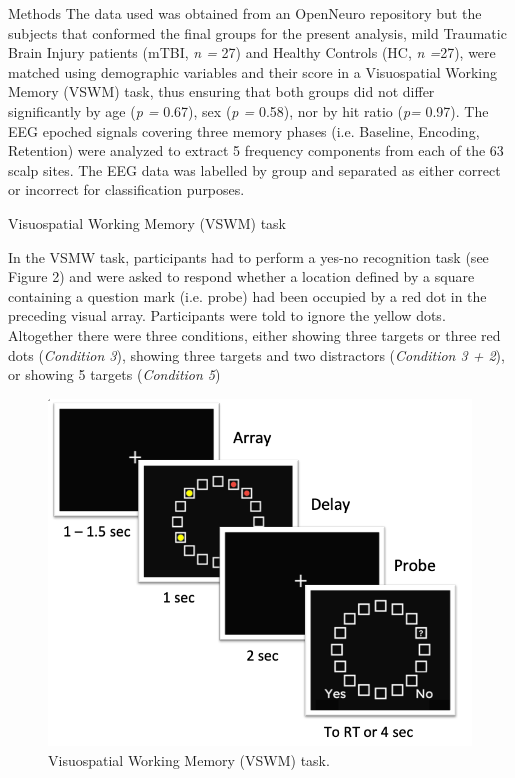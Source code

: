 \documentclass[final]{beamer}
\newlength{\colwidth}
\begin{document}
\begin{frame}[t]
\begin{columns}[t]
\begin{column}{\colwidth}
\begin{block}{Methods}
  The data used was obtained from an OpenNeuro repository but the subjects that conformed the final groups for the present analysis, mild Traumatic Brain Injury patients (mTBI, \textit{n = }27) and Healthy Controls (HC, \textit{n =}27), were matched using demographic variables and their score in a Visuospatial Working Memory (VSWM) task, thus ensuring that both groups did not differ significantly by age (\textit{p =} 0.67), sex (\textit{p =} 0.58), nor by hit ratio (\textit{p= }0.97). The EEG epoched signals covering three memory phases (i.e. Baseline, Encoding, Retention) were analyzed to extract 5 frequency components from each of the 63 scalp sites. The EEG data was labelled by group and separated as either correct or incorrect for classification purposes.
    
  \end{block}

  \begin{block}{Visuospatial Working Memory (VSWM) task}

In the VSMW task, participants had to perform a yes-no recognition task (see Figure 2) and were asked to respond whether a location defined by a square containing a question mark (i.e. probe) had been occupied by a red dot in the preceding visual array. Participants were told to ignore the yellow dots. Altogether there were three conditions, either showing three targets or three red dots (\textit{Condition 3}), showing three targets and two distractors (\textit{Condition 3 + 2}), or showing 5 targets (\textit{Condition 5})

    \begin{figure}
      \centering
     \includegraphics[width=24cm]{img/VSWM_task.png} 
      \caption{Visuospatial Working Memory (VSWM) task.}
    \end{figure}


\end{block}
\end{column}
\end{columns}
\end{frame}
\end{document}

